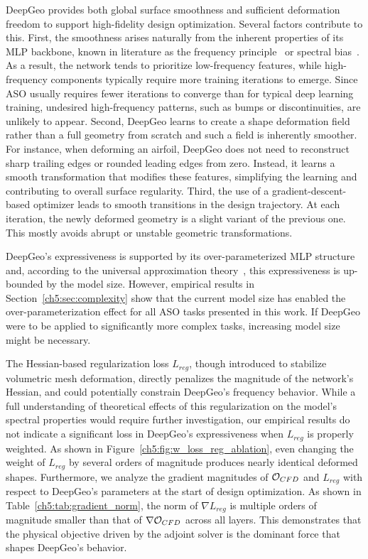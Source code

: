 DeepGeo provides both global surface smoothness and sufficient deformation freedom to support high-fidelity design optimization. Several factors contribute to this. First, the smoothness arises naturally from the inherent properties of its MLP backbone, known in literature as the frequency principle~\cite{ai.Xu2019f,ai.Xu2020c} or spectral bias~\cite{ai.Rahaman2019}. As a result, the network tends to prioritize low-frequency features, while high-frequency components typically require more training iterations to emerge. Since ASO usually requires fewer iterations to converge than for  typical deep learning training, undesired high-frequency patterns, such as bumps or discontinuities, are unlikely to appear. Second, DeepGeo learns to create a shape deformation field rather than a full geometry from scratch and such a field is inherently smoother. For instance, when deforming an airfoil, DeepGeo does not need to reconstruct sharp trailing edges or rounded leading edges from zero. Instead, it learns a smooth transformation that modifies these features, simplifying the learning and contributing to overall surface regularity. Third, the use of a gradient-descent-based optimizer leads to smooth transitions in the design trajectory. At each iteration, the newly deformed geometry is a slight variant of the previous one. This mostly avoids abrupt or unstable geometric transformations.

DeepGeo’s expressiveness is supported by its over-parameterized MLP structure and, according to the universal approximation theory~\cite{ai.Barron1993,ai.Poggio2017}, this expressiveness is up-bounded by the model size. However, empirical results in Section~\ref{ch5:sec:complexity} show that the current model size has enabled the over-parameterization effect for all ASO tasks presented in this work. If DeepGeo were to be applied to significantly more complex tasks, increasing model size might be necessary.

The Hessian-based regularization loss $L_{reg}$, though introduced to stabilize volumetric mesh deformation, directly penalizes the magnitude of the network’s Hessian, and could potentially constrain DeepGeo's frequency behavior. While a full understanding of theoretical effects of this regularization on the model’s spectral properties would require further investigation, our empirical results do not indicate a significant loss in DeepGeo's expressiveness when $L_{reg}$ is properly weighted. As shown in Figure~\ref{ch5:fig:w_loss_reg_ablation}, even changing the weight of $L_{reg}$ by several orders of magnitude produces nearly identical deformed shapes. Furthermore, we analyze the gradient magnitudes of $\mathcal{O}_{CFD}$ and $L_{reg}$ with respect to DeepGeo’s parameters at the start of design optimization. As shown in Table~\ref{ch5:tab:gradient_norm}, the norm of $\nabla L_{reg}$ is multiple orders of magnitude smaller than that of $\nabla \mathcal{O}_{CFD}$ across all layers. This demonstrates that the physical objective driven by the adjoint solver is the dominant force that shapes DeepGeo's behavior.

